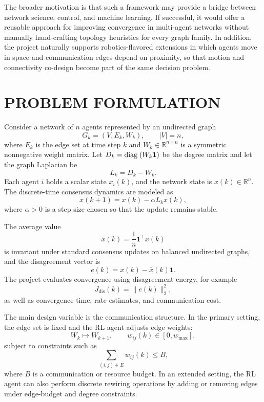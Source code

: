 \documentclass[letterpaper, 11 pt, journal, twoside]{IEEEtran}
\newcommand{\diag}{{\rm diag\;}}
\newcommand{\R}{\mathbb{R}}
\begin{document}
The broader motivation is that such a framework may provide a bridge between network science, control, and machine learning. If successful, it would offer a reusable approach for improving convergence in multi-agent networks without manually hand-crafting topology heuristics for every graph family. In addition, the project naturally supports robotics-flavored extensions in which agents move in space and communication edges depend on proximity, so that motion and connectivity co-design become part of the same decision problem.

\section{PROBLEM FORMULATION}
Consider a network of $n$ agents represented by an undirected graph
\begin{equation}
G_k = (V, E_k, W_k), \qquad |V| = n,
\end{equation}
where $E_k$ is the edge set at time step $k$ and $W_k \in \R^{n \times n}$ is a symmetric nonnegative weight matrix. Let $D_k = \diag(W_k \mathbf{1})$ be the degree matrix and let the graph Laplacian be
\begin{equation}
L_k = D_k - W_k.
\end{equation}
Each agent $i$ holds a scalar state $x_i(k)$, and the network state is $x(k) \in \R^n$. The discrete-time consensus dynamics are modeled as
\begin{equation}
x(k+1) = x(k) - \alpha L_k x(k),
\label{eq:consensus}
\end{equation}
where $\alpha > 0$ is a step size chosen so that the update remains stable.

The average value
\begin{equation}
\bar{x}(k) = \frac{1}{n}\mathbf{1}^\top x(k)
\end{equation}
is invariant under standard consensus updates on balanced undirected graphs, and the disagreement vector is
\begin{equation}
e(k) = x(k) - \bar{x}(k)\mathbf{1}.
\end{equation}
The project evaluates convergence using disagreement energy, for example
\begin{equation}
J_{\text{dis}}(k) = \|e(k)\|_2^2,
\end{equation}
as well as convergence time, rate estimates, and communication cost.

The main design variable is the communication structure. In the primary setting, the edge set is fixed and the RL agent adjusts edge weights:
\begin{equation}
W_k \mapsto W_{k+1}, \qquad w_{ij}(k) \in [0, w_{\max}],
\end{equation}
subject to constraints such as
\begin{equation}
\sum_{(i,j)\in E} w_{ij}(k) \le B,
\end{equation}
where $B$ is a communication or resource budget. In an extended setting, the RL agent can also perform discrete rewiring operations by adding or removing edges under edge-budget and degree constraints.
\end{document}
